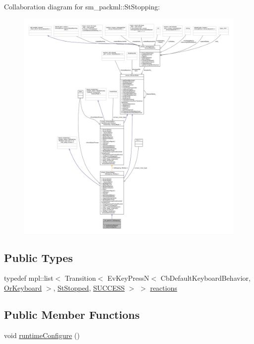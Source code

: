 Collaboration diagram for sm\+\_\+packml\+:\+:St\+Stopping\+:
\nopagebreak
\begin{figure}[H]
\begin{center}
\leavevmode
\includegraphics[width=350pt]{structsm__packml_1_1StStopping__coll__graph}
\end{center}
\end{figure}
\subsection*{Public Types}
\begin{DoxyCompactItemize}
\item 
typedef mpl\+::list$<$ Transition$<$ Ev\+Key\+PressN$<$ Cb\+Default\+Keyboard\+Behavior, \hyperlink{classsm__packml_1_1OrKeyboard}{Or\+Keyboard} $>$, \hyperlink{structsm__packml_1_1StStopped}{St\+Stopped}, \hyperlink{classSUCCESS}{S\+U\+C\+C\+E\+SS} $>$ $>$ \hyperlink{structsm__packml_1_1StStopping_a436a5a5334e71657c558b693f90c7029}{reactions}
\end{DoxyCompactItemize}
\subsection*{Public Member Functions}
\begin{DoxyCompactItemize}
\item 
void \hyperlink{structsm__packml_1_1StStopping_a0f8c7c3109b51da19a58774e6d36fdb5}{runtime\+Configure} ()
\end{DoxyCompactItemize}
